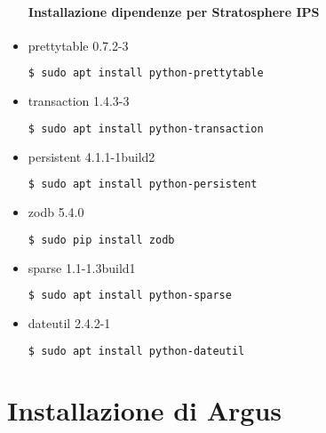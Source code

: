\documentclass[../main.tex]{subfiles}
\begin{document}
\begin{itemize}
				\paragraph{Installazione dipendenze per Stratosphere IPS}

				\item prettytable 0.7.2-3
\begin{lstlisting}[language=bash]
$ sudo apt install python-prettytable
\end{lstlisting}

				\item transaction 1.4.3-3
\begin{lstlisting}[language=bash]
$ sudo apt install python-transaction
\end{lstlisting}

				\item persistent 4.1.1-1build2
\begin{lstlisting}[language=bash]
$ sudo apt install python-persistent
\end{lstlisting}

				\item zodb 5.4.0
\begin{lstlisting}[language=bash]
$ sudo pip install zodb
\end{lstlisting}

				\item sparse 1.1-1.3build1
\begin{lstlisting}[language=bash]
$ sudo apt install python-sparse
\end{lstlisting}

				\item dateutil 2.4.2-1
\begin{lstlisting}[language=bash]
$ sudo apt install python-dateutil
\end{lstlisting}


\end{itemize}

\section{Installazione di Argus}
\end{document}
